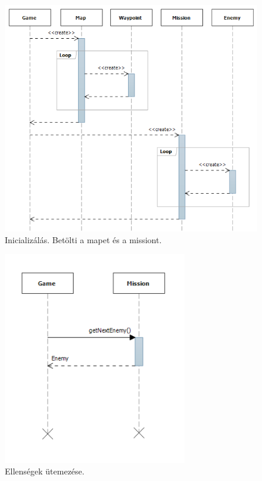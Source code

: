 \begin{figure}[H]
\begin{center}
\includegraphics[width=15cm]{images/ch04/init.png}
\caption{Inicializálás. Betölti a mapet és a missiont.}
\label{fig:starting_game}
\end{center}
\end{figure}

\begin{figure}[H]
\begin{center}
\includegraphics[width=8cm]{images/scheduling_enemies.png}
\caption{Ellenségek ütemezése.}
\label{fig:scheduling_enemies}
\end{center}
\end{figure}

